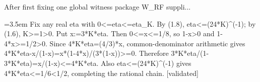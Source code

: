 \documentclass{article}
\newcommand{\step}[1]{\par\noindent\hangindent=3.5em\hangafter=1%
  \makebox[3.5em][l]{\textbf{#1.}}}
\newcommand{\steptag}[1]{\hfill{\small\textsf{[#1]}}}
\begin{document}
\begin{proofbox}{After first fixing one global witness package W\_RF suppli...}
\step{1.4} Fix any real eta with 0<=eta<=eta\_K. By (1.8), eta<=(24*K)\textasciicircum{}(-1); by (1.6), K>=1>0. Put x:=3*K*eta. Then 0<=x<=1/8, so 1-x>0 and 1-4*x>=1/2>0. Since 4*K*eta=(4/3)*x, common-denominator arithmetic gives 4*K*eta-x/(1-x)=x*(1-4*x)/(3*(1-x))>=0. Therefore 3*K*eta/(1-3*K*eta)=x/(1-x)<=4*K*eta. Also eta<=(24*K)\textasciicircum{}(-1) gives 4*K*eta<=1/6<1/2, completing the rational chain. \steptag{validated} \\[4pt]
\end{proofbox}
\end{document}

